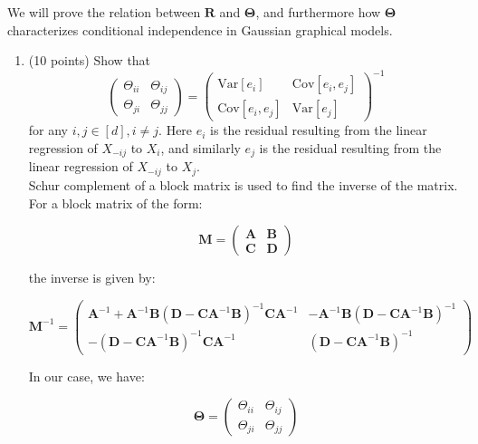 \documentclass[a3paper,12pt]{extarticle} %
\begin{document}
We will prove the relation between \( \mathbf{R} \) and \( \boldsymbol{\Theta} \), and furthermore how \( \boldsymbol{\Theta} \) characterizes conditional independence in Gaussian graphical models.

\begin{enumerate}
    \item (10 points) Show that
    \[
    \begin{pmatrix}
    \Theta_{ii} & \Theta_{ij} \\
    \Theta_{ji} & \Theta_{jj}
    \end{pmatrix}
    =
    \begin{pmatrix}
    \text{Var}[e_i] & \text{Cov}[e_i, e_j] \\
    \text{Cov}[e_i, e_j] & \text{Var}[e_j]
    \end{pmatrix}^{-1}
    \]
    for any \(i, j \in [d], i \neq j\). Here \(e_i\) is the residual resulting from the linear regression of \(X_{-ij}\) to \(X_i\), and similarly \(e_j\) is the residual resulting from the linear regression of \(X_{-ij}\) to \(X_j\).
   \\  Schur complement of a block matrix is used to find the inverse of the matrix. For a block matrix of the form:

    \[
    \mathbf{M} = \begin{pmatrix}
    \mathbf{A} & \mathbf{B} \\
    \mathbf{C} & \mathbf{D}
    \end{pmatrix}
    \]

    the inverse is given by:

    \[
    \mathbf{M}^{-1} = \begin{pmatrix}
    \mathbf{A}^{-1} + \mathbf{A}^{-1} \mathbf{B} (\mathbf{D} - \mathbf{C} \mathbf{A}^{-1} \mathbf{B})^{-1} \mathbf{C} \mathbf{A}^{-1} & -\mathbf{A}^{-1} \mathbf{B} (\mathbf{D} - \mathbf{C} \mathbf{A}^{-1} \mathbf{B})^{-1} \\
    -(\mathbf{D} - \mathbf{C} \mathbf{A}^{-1} \mathbf{B})^{-1} \mathbf{C} \mathbf{A}^{-1} & (\mathbf{D} - \mathbf{C} \mathbf{A}^{-1} \mathbf{B})^{-1}
    \end{pmatrix}
    \]

    In our case, we have:

    \[
    \mathbf{\Theta} = \begin{pmatrix}
    \Theta_{ii} & \Theta_{ij} \\
    \Theta_{ji} & \Theta_{jj}
    \end{pmatrix}
    \]


\end{enumerate}
\end{document}
